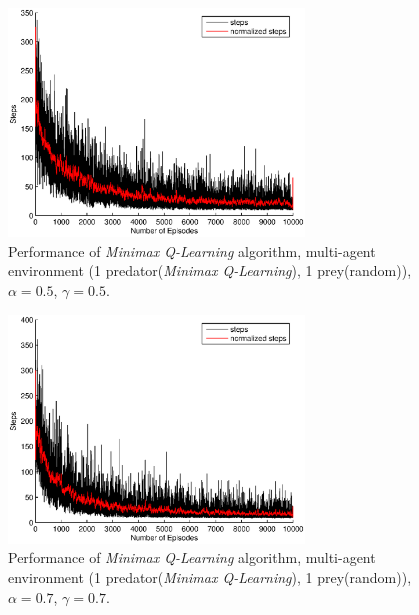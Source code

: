 \documentclass[a4paper,11pt]{article}
\begin{document}
\begin{figure}[h]
\begin{center}
    \includegraphics[width=0.7\textwidth]{figures/minimax0505.eps}
    \caption{Performance of  \textit{Minimax Q-Learning} algorithm, multi-agent environment (1 predator(\textit{Minimax Q-Learning}), 1 prey(random)), $\alpha = 0.5$, $\gamma = 0.5$.}
    \label{m11}
\end{center}
\end{figure}

\begin{figure}[h]
\begin{center}
	\includegraphics[width=0.7\textwidth]{figures/minimax0707.eps}
   \caption{Performance of  \textit{Minimax Q-Learning} algorithm, multi-agent environment (1 predator(\textit{Minimax Q-Learning}), 1 prey(random)), $\alpha = 0.7$, $\gamma = 0.7$.}
    \label{m22}
\end{center}
\end{figure}
\end{document}
